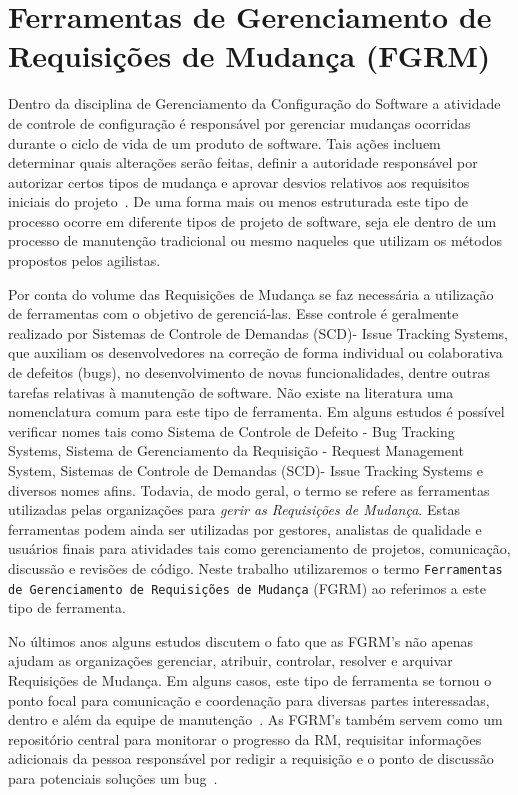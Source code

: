 \section{Ferramentas de Gerenciamento de Requisições de Mudança (FGRM)}
\label{sec:ferramentas_de_gerenciameto_de_requisições_de_mudança}

Dentro da disciplina de Gerenciamento da Configuração do Software a atividade de
controle de configuração é responsável por gerenciar mudanças ocorridas durante
o ciclo de vida de um produto de software. Tais ações incluem determinar quais
alterações serão feitas, definir a autoridade responsável por autorizar certos
tipos de mudança e aprovar desvios relativos aos requisitos iniciais do
projeto~\cite{4425813}. De uma forma mais ou menos estruturada este tipo de
processo ocorre em diferente tipos de projeto de software, seja ele dentro de um
processo de manutenção tradicional ou mesmo naqueles que utilizam os métodos
propostos pelos agilistas. 

Por conta do volume das Requisições de Mudança se faz necessária a utilização de
ferramentas com o objetivo de gerenciá-las. Esse controle é geralmente realizado
por Sistemas de Controle de Demandas (SCD)- Issue Tracking Systems, que auxiliam
os desenvolvedores na correção de forma individual ou colaborativa de defeitos
(bugs), no desenvolvimento de novas funcionalidades, dentre outras tarefas
relativas à manutenção de software. Não existe na literatura uma nomenclatura
comum para este tipo de ferramenta. Em alguns estudos é possível verificar nomes
tais como Sistema de Controle de Defeito - Bug Tracking Systems, Sistema de
Gerenciamento da Requisição - Request Management System, Sistemas de Controle de
Demandas (SCD)- Issue Tracking Systems e diversos nomes afins. Todavia, de modo
geral, o termo se refere as ferramentas utilizadas pelas organizações para
\textit{gerir as Requisições de Mudança}. Estas ferramentas podem ainda ser
utilizadas por gestores, analistas de qualidade e usuários finais para
atividades tais como gerenciamento de projetos, comunicação, discussão e
revisões de código. Neste trabalho utilizaremos o termo \texttt{Ferramentas de
	Gerenciamento de Requisições de Mudança} (FGRM) ao referimos a este tipo de
ferramenta.

No últimos anos alguns estudos discutem o fato que as FGRM's não apenas ajudam
as organizações gerenciar, atribuir, controlar, resolver e arquivar Requisições
de Mudança. Em alguns casos, este tipo de ferramenta se tornou o ponto focal
para comunicação e coordenação para diversas partes interessadas, dentro e além
da equipe de manutenção~\cite{Bertram:2010:CCB:1718918.1718972}.  As FGRM's
também servem como um repositório central para monitorar o progresso da RM,
requisitar informações adicionais da pessoa responsável por redigir a requisição
e o ponto de discussão para potenciais soluções um
bug~\cite{zimmermann2009improving}.

